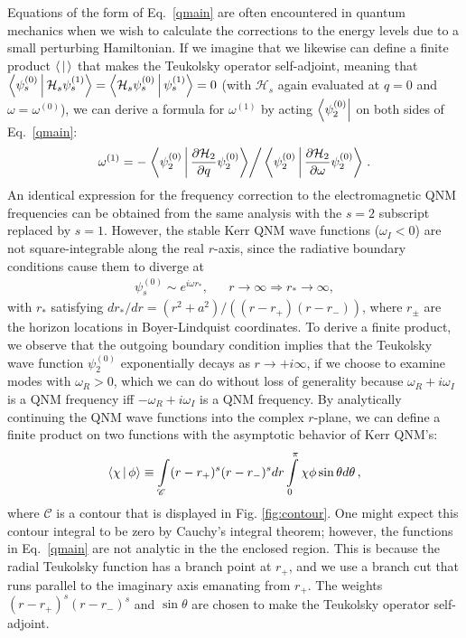 \begin{refsection}
Equations of the form of Eq.~\eqref{qmain} are often encountered in quantum mechanics when we wish to calculate the corrections to the energy levels due to a small perturbing Hamiltonian. 
If we imagine that we likewise can define a finite product $\Braket{|}$ that makes the Teukolsky operator self-adjoint, meaning that $\Braket{\psi_s^{(0)} | \mathcal{H}_s \psi_s^{(1)} } = \Braket{\mathcal{H}_s \psi_s^{(0)} | \psi_s^{(1)} }= 0$ (with $\mathcal{H}_s$ again evaluated at $q =0$ and $\omega=\omega^{(0)}$),
we can derive a formula for $\omega^{(1)}$ by acting $\Bra{\psi_2^{(0)}}$ on both sides of  Eq.~\eqref{qmain}:
\begin{align} 
\omega^{(1)}=-\left .\Braket{\psi_2^{(0)}|\frac{\partial \mathcal{H}_2 }{\partial q}\psi_2^{(0)}} \right /\Braket{\psi_2^{(0)}|\frac{\partial \mathcal{H}_2 }{\partial \omega}\psi_2^{(0)}}\,.
\label{freqform}
\end{align}
An identical expression for the frequency correction to the electromagnetic QNM frequencies can be obtained from the same analysis with the $s=2$ subscript replaced by $s=1$. 
However, the stable Kerr QNM wave functions ($\omega_I < 0$) are not square-integrable along the real $r$-axis, since the radiative boundary conditions cause them to diverge at 
\begin{align}
&\psi_s^{(0)} \sim e^{i\omega r_*},& &r \to \infty \Rightarrow r_* \to \infty,&
\end{align}
with $r_*$ satisfying $dr_*/dr =(r^2+a^2)/((r-r_+)(r-r_-))$, where $r_\pm$ are the horizon locations in Boyer-Lindquist coordinates.
To derive a finite product, we observe that the outgoing boundary condition implies that the Teukolsky wave function $\psi_2^{(0)}$ exponentially decays as $r \to + i \infty$, if we choose to examine modes with $\omega_R>0$, which we can do without loss of generality because $\omega_R+i\omega_I$ is a QNM frequency iff $-\omega_R+i\omega_I$ is a QNM frequency. By analytically continuing the QNM wave functions into the complex $r$-plane, we can define a finite product on two functions with the asymptotic behavior of Kerr QNM's:
\begin{align}
\Braket{\chi | \phi} \equiv \int \limits_\mathscr{C}(r-r_+)^s(r-r_-)^s dr \int \limits_0^\pi  \chi \phi \sin\theta d\theta\,,
\label{prod}
\end{align}
where $\mathscr{C}$ is a contour that is displayed in Fig. \ref{fig:contour}. One might expect this contour integral to be zero by Cauchy's integral theorem; however, the functions in Eq.~\eqref{qmain} are not analytic in the the enclosed region. This is because the radial Teukolsky function has a branch point at $r_+$, and we use a branch cut that runs parallel to the imaginary axis emanating from $r_+$. The weights $(r-r_+)^s(r-r_-)^s$ and $\sin\theta$ are chosen to make the Teukolsky operator self-adjoint.


\end{refsection}
